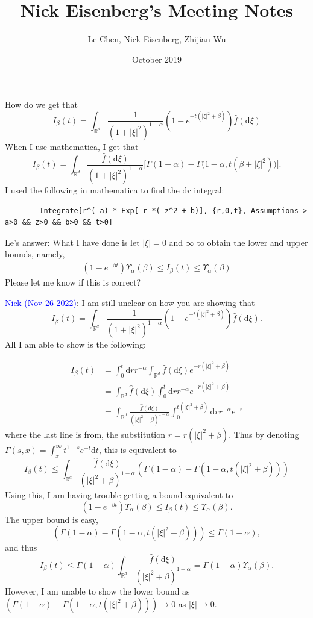 \documentclass[a4paper,11pt]{article}
\title{Nick Eisenberg's Meeting Notes}
\author{Le Chen, Nick Eisenberg, Zhijian Wu}
\date{October 2019}
\numberwithin{equation}{section}
\theoremstyle{plain}
\theoremstyle{definition}
\newcommand{\ud}{\ensuremath{\mathrm{d} }}
\newcommand{\R}{\mathbb{R}}
\numberwithin{NQ}{section}
\numberwithin{LQ}{section}
\numberwithin{ZQ}{section}
\begin{document}
How do we get that
	\[
		I_{\beta}(t) = \int_{\R^d} \frac{1}{(1 + |\xi|^2)^{1-\alpha}}\left( 1 - e^{-t(|\xi|^2 + \beta)} \right) \hat{f}(\ud \xi)
	\]
	When I use mathematica, I get that 
	\[
			I_{\beta}(t) = \int_{\R^d} \frac{\hat{f}(\ud \xi)}{(1 + |\xi|^2)^{1-\alpha}} \bigg[ \Gamma(1-\alpha) - \Gamma\big(1-\alpha, t(\beta + |\xi|^2)\big) \bigg].
	\]
	I used the following in mathematica to find the $\ud r$ integral:
	\begin{verbatim}
		Integrate[r^(-a) * Exp[-r *( z^2 + b)], {r,0,t}, Assumptions-> a>0 && z>0 && b>0 && t>0] 
	\end{verbatim}

\bigskip

Le's answer: What I have done is let $|\xi|=0$ and $\infty$ to obtain the lower and upper bounds, namely,
\begin{align*}
  \left(1-e^{-\beta t}\right) \Upsilon_\alpha(\beta) \le I_\beta(t) \le
  \Upsilon_\alpha(\beta)
\end{align*}
Please let me know if this is correct?

\bigskip

\textcolor{blue}{Nick (Nov 26 2022)}:
I am still unclear on how you are showing that 
\[
I_{\beta}(t) = \int_{\R^d} \frac{1}{(1 + |\xi|^2)^{1-\alpha}}\left( 1 - e^{-t(|\xi|^2 + \beta)} \right) \hat{f}(\ud \xi).
\]
All I am able to show is the following:

\begin{align}
I_{\beta}(t) &= \int_0^t \ud r r^{-\alpha} \int_{\R^d} \widehat{f}(\ud \xi) e^{-r(|\xi|^2 + \beta)} \nonumber\\
&= \int_{\R^d}  \widehat{f}(\ud \xi) \int_0^t \ud r r^{-\alpha}  e^{-r(|\xi|^2 + \beta)} \nonumber \\
&= \int_{\R^d}  \frac{\widehat{f}(\ud \xi)}{(|\xi|^2 + \beta)^{1-\alpha} } \int_0^{t(|\xi|^2 + \beta)} \ud r r^{-\alpha} e^{-r} \label{E:Ibeta}
\end{align}
where the last line is from, the substitution $r = r(|\xi|^2 + \beta)$. Thus by denoting $\Gamma(s, x) = \int_x^\infty t^{1-s} e^{-t} \ud t$, this is equivalent to
\[
I_{\beta}(t) \le \int_{\R^d}  \frac{\widehat{f}(\ud \xi)}{(|\xi|^2 + \beta)^{1-\alpha} } \left( \Gamma(1 - \alpha) - \Gamma(1 - \alpha,t(|\xi|^2 + \beta) ) \right)
\]
Using this, I am having trouble getting a bound equivalent to  
\[  \left(1-e^{-\beta t}\right) \Upsilon_\alpha(\beta) \le I_\beta(t) \le
\Upsilon_\alpha(\beta).
\]
The upper bound is easy,
\[
\left( \Gamma(1 - \alpha) - \Gamma(1 - \alpha,t(|\xi|^2 + \beta) ) \right) \le \Gamma(1 - \alpha),
\]
and thus 
\[
I_{\beta}(t) \le  \Gamma(1 - \alpha)\int_{\R^d}  \frac{\widehat{f}(\ud \xi)}{(|\xi|^2 + \beta)^{1-\alpha} } =   \Gamma(1 - \alpha) \Upsilon_\alpha(\beta).
\]
However, I am unable to show the lower bound as $\left( \Gamma(1 - \alpha) - \Gamma(1 - \alpha,t(|\xi|^2 + \beta) ) \right) \to 0$ as $|\xi| \to 0$.
\end{document}
